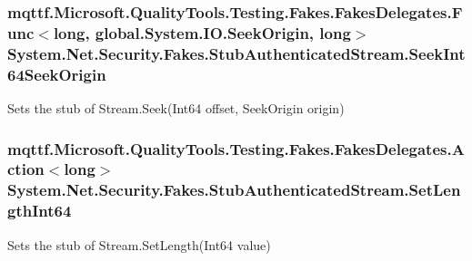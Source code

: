 \hypertarget{class_system_1_1_net_1_1_security_1_1_fakes_1_1_stub_authenticated_stream_ace093a958aac9a94f9e23ce8bb3039b4}{
\subsubsection[{Seek\-Int64\-Seek\-Origin}]{\setlength{\rightskip}{0pt plus 5cm}mqttf.\-Microsoft.\-Quality\-Tools.\-Testing.\-Fakes.\-Fakes\-Delegates.\-Func$<$long, global.\-System.\-I\-O.\-Seek\-Origin, long$>$ System.\-Net.\-Security.\-Fakes.\-Stub\-Authenticated\-Stream.\-Seek\-Int64\-Seek\-Origin}}\label{class_system_1_1_net_1_1_security_1_1_fakes_1_1_stub_authenticated_stream_ace093a958aac9a94f9e23ce8bb3039b4}


Sets the stub of Stream.\-Seek(\-Int64 offset, Seek\-Origin origin)

\hypertarget{class_system_1_1_net_1_1_security_1_1_fakes_1_1_stub_authenticated_stream_a3ac2ce26b48166ebaa09bfba68444876}{
\subsubsection[{Set\-Length\-Int64}]{\setlength{\rightskip}{0pt plus 5cm}mqttf.\-Microsoft.\-Quality\-Tools.\-Testing.\-Fakes.\-Fakes\-Delegates.\-Action$<$long$>$ System.\-Net.\-Security.\-Fakes.\-Stub\-Authenticated\-Stream.\-Set\-Length\-Int64}}\label{class_system_1_1_net_1_1_security_1_1_fakes_1_1_stub_authenticated_stream_a3ac2ce26b48166ebaa09bfba68444876}


Sets the stub of Stream.\-Set\-Length(\-Int64 value)

